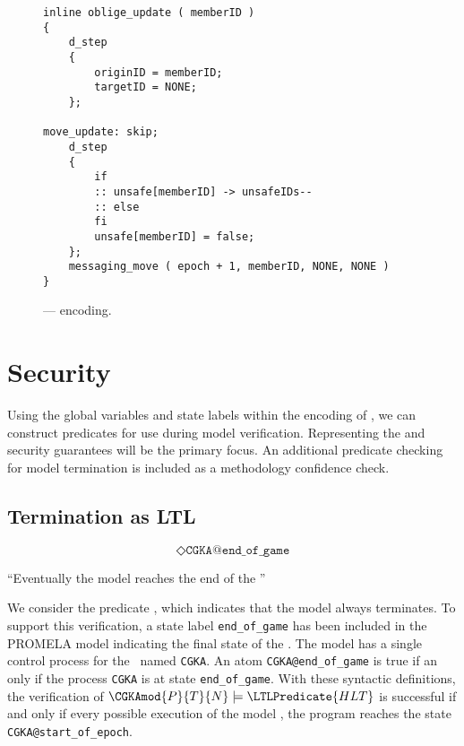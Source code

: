 \begin{figure}[ht!]
  \centering
  \caption{\label{fig:Oracle-Update}\CGKAmod{}{}{} ---  encoding.}
\begin{verbatim}
inline oblige_update ( memberID )
{
    d_step
    {
        originID = memberID;
        targetID = NONE;
    };

move_update: skip;
    d_step
    {
        if
        :: unsafe[memberID] -> unsafeIDs--
        :: else
        fi
        unsafe[memberID] = false;
    };
    messaging_move ( epoch + 1, memberID, NONE, NONE )
}
\end{verbatim}
\end{figure}


\hypertarget{sec:LTL-security}{%
\section{Security}\label{sec:LTL-security}}

Using the global variables and state labels within the encoding of , we can construct  predicates for use during model verification.
Representing the  and  security guarantees will be the primary focus.
An additional predicate checking for model termination is included as a methodology confidence check.


\hypertarget{sec:hlt-as-ltl}{%
\subsection{Termination as LTL}\label{sec:hlt-as-ltl}}

\begin{LTL}
\[
    \Diamond \texttt{CGKA@end\_of\_game}
\]
\begin{quoting}
``Eventually the model reaches the end of the \CGKAsec''
\end{quoting}
\end{LTL}

We consider the  predicate , which indicates that the  model always terminates.
To support this verification, a state label \texttt{end\_of\_game} has been included in the PROMELA model indicating the final state of the \CGKAsec. 
The model has a single control process for the \CGKAsec\ named \texttt{CGKA}.
An  atom \texttt{CGKA@end\_of\_game} is true if an only if the process \texttt{CGKA} is at state \texttt{end\_of\_game}.
With these syntactic definitions, the verification of \(\CGKAmod{P}{T}{N} \models \LTLPredicate{HLT}\) is successful if and only if every possible execution of the model \CGKAmod{}{}{}, the program reaches the state \texttt{CGKA@start\_of\_epoch}.


